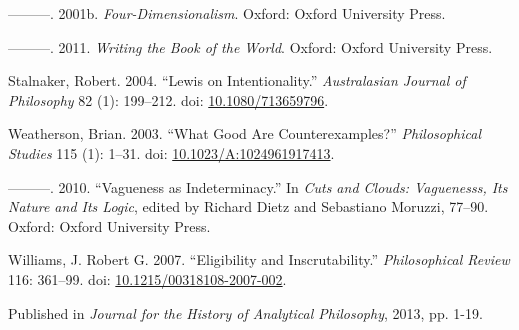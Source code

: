 \documentclass[
  11pt,
  letterpaper,
  DIV=11,
  numbers=noendperiod,
  twoside]{scrartcl}
\newlength{\cslhangindent}
\newenvironment{CSLReferences}[2] %
 {\begin{list}{}{%
  \setlength{\itemindent}{0pt}
  \setlength{\leftmargin}{0pt}
  \setlength{\parsep}{0pt}
  \ifodd #1
   \setlength{\leftmargin}{\cslhangindent}
   \setlength{\itemindent}{-1\cslhangindent}
  \fi
  \setlength{\itemsep}{#2\baselineskip}}}
 {\end{list}}
\begin{document}
\begin{CSLReferences}{1}{0}
---------. 2001b. \emph{Four-Dimensionalism}. Oxford: Oxford University
Press.

---------. 2011. \emph{Writing the Book of the World}. Oxford: Oxford
University Press.

Stalnaker, Robert. 2004. {``{Lewis on Intentionality}.''}
\emph{Australasian Journal of Philosophy} 82 (1): 199--212. doi:
\href{https://doi.org/10.1080/713659796}{10.1080/713659796}.

Weatherson, Brian. 2003. {``{What Good Are Counterexamples?}''}
\emph{Philosophical Studies} 115 (1): 1--31. doi:
\href{https://doi.org/10.1023/A:1024961917413}{10.1023/A:1024961917413}.

---------. 2010. {``Vagueness as Indeterminacy.''} In \emph{Cuts and
Clouds: Vaguenesss, Its Nature and Its Logic}, edited by Richard Dietz
and Sebastiano Moruzzi, 77--90. Oxford: Oxford University Press.

Williams, J. Robert G. 2007. {``Eligibility and Inscrutability.''}
\emph{Philosophical Review} 116: 361--99. doi:
\href{https://doi.org/10.1215/00318108-2007-002}{10.1215/00318108-2007-002}.

\end{CSLReferences}



\noindent Published in\emph{
Journal for the History of Analytical Philosophy}, 2013, pp. 1-19.
\end{document}
